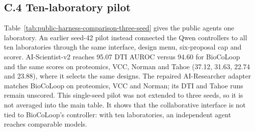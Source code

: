 \subsection*{C.4 Ten-laboratory pilot}
Table~\ref{tab:public-harness-comparison-three-seed} gives the public agents one laboratory. An earlier seed-42 pilot instead connected the Qwen controllers to all ten laboratories through the same interface, design menu, six-proposal cap and scorer. AI-Scientist-v2 reaches 95.07 DTI AUROC versus 94.60 for BioCoLoop and the same scores on proteomics, VCC, Norman and Tahoe (37.12, 31.63, 22.74 and 23.88), where it selects the same designs. The repaired AI-Researcher adapter matches BioCoLoop on proteomics, VCC and Norman; its DTI and Tahoe runs remain unscored. This single-seed pilot was not extended to three seeds, so it is not averaged into the main table. It shows that the collaborative interface is not tied to BioCoLoop's controller: with ten laboratories, an independent agent reaches comparable models.
